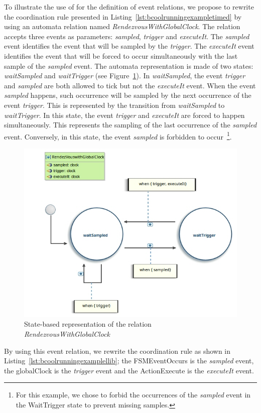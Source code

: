 To illustrate the use of \moccml for the definition of event relations, we propose to rewrite the coordination rule presented in Listing~\ref{lst:bcoolrunningexampletimed} by using an automata relation named \emph{RendezvousWithGlobalClock}. The relation accepts three events as parameters: \emph{sampled}, \emph{trigger} and \emph{executeIt}. The \emph{sampled} event identifies the event that will be sampled by the \emph{trigger}. The \emph{executeIt} event identifies the event that will be forced to occur simultaneously with the last sample of the \emph{sampled} event. The automata representation is made of two states: \emph{waitSampled} and \emph{waitTrigger} (see Figure~\ref{fig:moccmllib}). In \emph{waitSampled}, the event \emph{trigger} and \emph{sampled} are both allowed to tick but not the \emph{executeIt} event. When the event \emph{sampled} happens, such occurrence will be sampled by the next occurrence of the event \emph{trigger}. This is represented by the transition from \emph{waitSampled} to \emph{waitTrigger}. In this state, the event \emph{trigger} and \emph{executeIt} are forced to happen simultaneously. This represents the sampling of the last occurrence of the \emph{sampled} event. Conversely, in this state, the event \emph{sampled} is forbidden to occur~\footnote{For this example, we chose to forbid the occurrences of the \emph{sampled} event in the WaitTrigger state to prevent missing samples.}. 

\begin{figure}[h]
	\center
	\includegraphics[width=.7\textwidth]{bcool/figs/moccmllib.jpg}
	\caption{State-based representation of the relation \emph{RendezvousWithGlobalClock}}
	\label{fig:moccmllib}
\end{figure}

By using this event relation, we rewrite the coordination rule as shown in Listing~\ref{lst:bcoolrunningexamplellib}; the FSMEventOccurs is the \emph{sampled} event, the globalClock is the \emph{trigger} event and the ActionExecute is the \emph{executeIt} event. 



